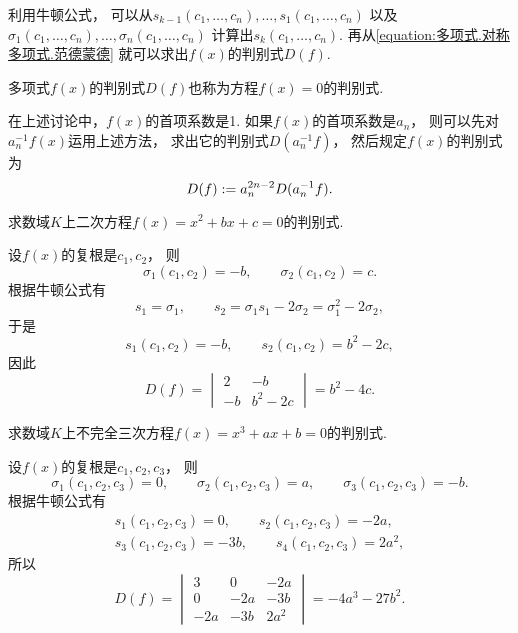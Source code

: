 利用牛顿公式，
可以从\(s_{k-1}(c_1,\dotsc,c_n),\dotsc,s_1(c_1,\dotsc,c_n)\)
以及\(\sigma_1(c_1,\dotsc,c_n),\dotsc,\sigma_n(c_1,\dotsc,c_n)\)
计算出\(s_k(c_1,\dotsc,c_n)\).
再从\cref{equation:多项式.对称多项式.范德蒙德}
就可以求出\(f(x)\)的判别式\(D(f)\).

多项式\(f(x)\)的判别式\(D(f)\)也称为方程\(f(x)=0\)的判别式.

\begin{remark}
在上述讨论中，\(f(x)\)的首项系数是1.
如果\(f(x)\)的首项系数是\(a_n\)，
则可以先对\(a_n^{-1} f(x)\)运用上述方法，
求出它的判别式\(D(a_n^{-1} f)\)，
然后规定\(f(x)\)的判别式为
\begin{equation}
	D(f)
	:=
	a_n^{2n-2} D(a_n^{-1} f).
\end{equation}
\end{remark}

\begin{example}
求数域\(K\)上二次方程\(f(x)=x^2+bx+c=0\)的判别式.
\begin{solution}
设\(f(x)\)的复根是\(c_1,c_2\)，
则\[
	\sigma_1(c_1,c_2)=-b, \qquad
	\sigma_2(c_1,c_2)=c.
\]
根据牛顿公式有\[
	s_1=\sigma_1, \qquad
	s_2=\sigma_1 s_1 - 2\sigma_2
	=\sigma_1^2-2\sigma_2,
\]
于是\[
	s_1(c_1,c_2)=-b, \qquad
	s_2(c_1,c_2)=b^2-2c,
\]
因此\[
	D(f)
	=\begin{vmatrix}
		2 & -b \\
		-b & b^2-2c
	\end{vmatrix}
	=b^2-4c.
\]
\end{solution}
\end{example}

\begin{example}
求数域\(K\)上不完全三次方程\(f(x)=x^3+ax+b=0\)的判别式.
\begin{solution}
设\(f(x)\)的复根是\(c_1,c_2,c_3\)，
则\[
	\sigma_1(c_1,c_2,c_3)=0, \qquad
	\sigma_2(c_1,c_2,c_3)=a, \qquad
	\sigma_3(c_1,c_2,c_3)=-b.
\]
根据牛顿公式有\begin{gather*}
	s_1(c_1,c_2,c_3)=0, \qquad
	s_2(c_1,c_2,c_3)=-2a, \\
	s_3(c_1,c_2,c_3)=-3b, \qquad
	s_4(c_1,c_2,c_3)=2a^2,
\end{gather*}
所以\[
	D(f)
	=\begin{vmatrix}
		3 & 0 & -2a \\
		0 & -2a & -3b \\
		-2a & -3b & 2a^2
	\end{vmatrix}
	=-4a^3-27b^2.
\]
\end{solution}
\end{example}
